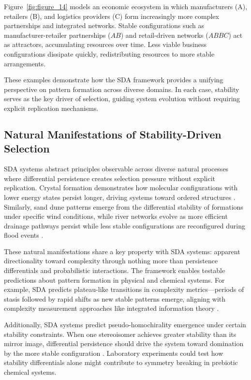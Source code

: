 \documentclass[preprint,12pt]{elsarticle}
\begin{document}
Figure~\ref{fig:figure_14} models an economic ecosystem in which manufacturers (A), retailers (B), and logistics providers (C) form increasingly more complex partnerships and integrated networks. Stable configurations such as manufacturer-retailer partnerships (\( AB \)) and retail-driven networks (\( ABBC \)) act as attractors, accumulating resources over time. Less viable business configurations dissipate quickly, redistributing resources to more stable arrangements.

These examples demonstrate how the SDA framework provides a unifying perspective on pattern formation across diverse domains. In each case, stability serves as the key driver of selection, guiding system evolution without requiring explicit replication mechanisms.

\subsection{Natural Manifestations of Stability-Driven Selection}

SDA systems abstract principles observable across diverse natural processes where differential persistence creates selection pressure without explicit replication. Crystal formation demonstrates how molecular configurations with lower energy states persist longer, driving systems toward ordered structures \cite{ball1999self}. Similarly, sand dune patterns emerge from the differential stability of formations under specific wind conditions, while river networks evolve as more efficient drainage pathways persist while less stable configurations are reconfigured during flood events \cite{kelso1997dynamic}.

These natural manifestations share a key property with SDA systems: apparent directionality toward complexity through nothing more than persistence differentials and probabilistic interactions. The framework enables testable predictions about pattern formation in physical and chemical systems. For example, SDA predicts plateau-like transitions in complexity metrics—periods of stasis followed by rapid shifts as new stable patterns emerge, aligning with complexity measurement approaches like integrated information theory \cite{tononi2008phi}.

Additionally, SDA systems predict pseudo-homochirality emergence under certain stability constraints. When one stereoisomer achieves greater stability than its mirror image, differential persistence should drive the system toward domination by the more stable configuration \cite{blackmond2010chiral}. Laboratory experiments could test how stability differentials alone might contribute to symmetry breaking in prebiotic chemical systems.
\end{document}
